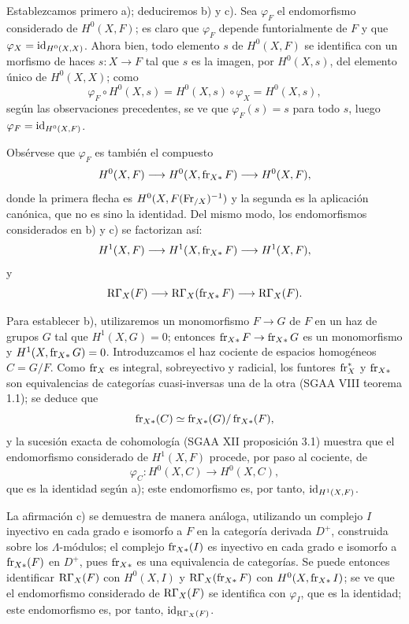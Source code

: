 Establezcamos primero a); deduciremos b) y c). Sea $\varphi_F$ el endomorfismo considerado de $H^0(X,F)$; es claro que $\varphi_F$ depende funtorialmente de $F$ y que $\varphi_X=\operatorname{id}_{H^0(X,X)}$. Ahora bien, todo elemento $s$ de $H^0(X,F)$ se identifica con un morfismo de haces $s:X\to F$ tal que $s$ es la imagen, por $H^0(X,s)$, del elemento único de $H^0(X,X)$; como
\[
\varphi_F\circ H^0(X,s)=H^0(X,s)\circ\varphi_X=H^0(X,s),
\]
según las observaciones precedentes, se ve que $\varphi_F(s)=s$ para todo $s$, luego $\varphi_F=\operatorname{id}_{H^0(X,F)}$.

Obsérvese que $\varphi_F$ es también el compuesto
\[
H^0(X,F)\longrightarrow H^0(X,\operatorname{fr}_{X*}F)
\longrightarrow H^0(X,F),
\]
donde la primera flecha es $H^0(X,F(\operatorname{Fr}_{/X})^{-1})$ y la segunda es la aplicación canónica, que no es sino la identidad. Del mismo modo, los endomorfismos considerados en b) y c) se factorizan así:
\[
H^1(X,F)\longrightarrow H^1(X,\operatorname{fr}_{X*}F)
\longrightarrow H^1(X,F),
\]
y
\[
\mathrm R\Gamma_X(F)\longrightarrow \mathrm R\Gamma_X(\operatorname{fr}_{X*}F)
\longrightarrow \mathrm R\Gamma_X(F).
\]

Para establecer b), utilizaremos un monomorfismo $F\to G$ de $F$ en un haz de grupos $G$ tal que $H^1(X,G)=0$; entonces $\operatorname{fr}_{X*}F\to\operatorname{fr}_{X*}G$ es un monomorfismo y $H^1(X,\operatorname{fr}_{X*}G)=0$. Introduzcamos el haz cociente de espacios homogéneos $C=G/F$. Como $\operatorname{fr}_X$ es integral, sobreyectivo y radicial, los funtores $\operatorname{fr}_X^*$ y $\operatorname{fr}_{X*}$ son equivalencias de categorías cuasi-inversas una de la otra (SGAA VIII teorema 1.1); se deduce que
\[
\operatorname{fr}_{X*}(C)\simeq\operatorname{fr}_{X*}(G)/\operatorname{fr}_{X*}(F),
\]
y la sucesión exacta de cohomología (SGAA XII proposición 3.1) muestra que el endomorfismo considerado de $H^1(X,F)$ procede, por paso al cociente, de
\[
\varphi_C:H^0(X,C)\longrightarrow H^0(X,C),
\]
que es la identidad según a); este endomorfismo es, por tanto, $\operatorname{id}_{H^1(X,F)}$.

La afirmación c) se demuestra de manera análoga, utilizando un complejo $I$ inyectivo en cada grado e isomorfo a $F$ en la categoría derivada $D^+$, construida sobre los $\Lambda$-módulos; el complejo $\operatorname{fr}_{X*}(I)$ es inyectivo en cada grado e isomorfo a $\operatorname{fr}_{X*}(F)$ en $D^+$, pues $\operatorname{fr}_{X*}$ es una equivalencia de categorías. Se puede entonces identificar $\mathrm R\Gamma_X(F)$ con $H^0(X,I)$ y $\mathrm R\Gamma_X(\operatorname{fr}_{X*}F)$ con $H^0(X,\operatorname{fr}_{X*}I)$; se ve que el endomorfismo considerado de $\mathrm R\Gamma_X(F)$ se identifica con $\varphi_I$, que es la identidad; este endomorfismo es, por tanto, $\operatorname{id}_{\mathrm R\Gamma_X(F)}$.
